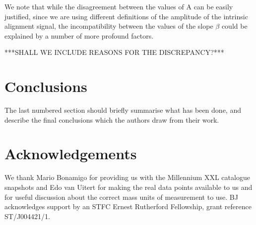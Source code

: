 \documentclass[a4paper,fleqn,usenatbib]{mnras}
\begin{document}
We note that while the disagreement between the values of A can be easily justified, since we are using different definitions of the amplitude of the intrinsic alignment signal, the incompatibility between the values of the slope $\beta$ could be explained by a number of more profound factors.

***SHALL WE INCLUDE REASONS FOR THE DISCREPANCY?***

\section{Conclusions}

The last numbered section should briefly summarise what has been done, and describe
the final conclusions which the authors draw from their work.

\section*{Acknowledgements}

We thank Mario Bonamigo for providing us with the Millennium XXL catalogue snapshots and Edo van Uitert for making the real data points available to us and for useful discussion about the correct mass units of measurement to use. BJ acknowledges support by an STFC Ernest Rutherford Fellowship, grant reference ST/J004421/1.




%
\end{document}
